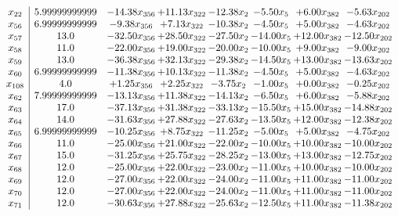 \documentclass[8pt]{article}
\begin{document}
\[\begin{array}{c| c c@{\hskip 2pt} c@{\hskip 2pt} c@{\hskip 2pt} c@{\hskip 2pt} c@{\hskip 2pt} c@{\hskip 2pt} }
 x_{22}   &  5.99999999999 & -14.38 x_{356} & + 11.13 x_{322} & -12.38 x_{2} & -5.50 x_{5} & +  6.00 x_{382} & -5.63 x_{202}\\
 x_{56}   &  6.99999999999 & -9.38 x_{356} & +  7.13 x_{322} & -10.38 x_{2} & -4.50 x_{5} & +  5.00 x_{382} & -4.63 x_{202}\\
 x_{57}   &  13.0 & -32.50 x_{356} & + 28.50 x_{322} & -27.50 x_{2} & -14.00 x_{5} & + 12.00 x_{382} & -12.50 x_{202}\\
 x_{58}   &  11.0 & -22.00 x_{356} & + 19.00 x_{322} & -20.00 x_{2} & -10.00 x_{5} & +  9.00 x_{382} & -9.00 x_{202}\\
 x_{59}   &  13.0 & -36.38 x_{356} & + 32.13 x_{322} & -29.38 x_{2} & -14.50 x_{5} & + 13.00 x_{382} & -13.63 x_{202}\\
 x_{60}   &  6.99999999999 & -11.38 x_{356} & + 10.13 x_{322} & -11.38 x_{2} & -4.50 x_{5} & +  5.00 x_{382} & -4.63 x_{202}\\
 x_{108}   &  4.0 & +  1.25 x_{356} & +  2.25 x_{322} & -3.75 x_{2} & -1.00 x_{5} & +  0.00 x_{382} & -0.25 x_{202}\\
 x_{62}   &  7.99999999999 & -13.13 x_{356} & + 11.38 x_{322} & -14.13 x_{2} & -6.50 x_{5} & +  6.00 x_{382} & -5.88 x_{202}\\
 x_{63}   &  17.0 & -37.13 x_{356} & + 31.38 x_{322} & -33.13 x_{2} & -15.50 x_{5} & + 15.00 x_{382} & -14.88 x_{202}\\
 x_{64}   &  14.0 & -31.63 x_{356} & + 27.88 x_{322} & -27.63 x_{2} & -13.50 x_{5} & + 12.00 x_{382} & -12.38 x_{202}\\
 x_{65}   &  6.99999999999 & -10.25 x_{356} & +  8.75 x_{322} & -11.25 x_{2} & -5.00 x_{5} & +  5.00 x_{382} & -4.75 x_{202}\\
 x_{66}   &  11.0 & -25.00 x_{356} & + 21.00 x_{322} & -22.00 x_{2} & -10.00 x_{5} & + 10.00 x_{382} & -10.00 x_{202}\\
 x_{67}   &  15.0 & -31.25 x_{356} & + 25.75 x_{322} & -28.25 x_{2} & -13.00 x_{5} & + 13.00 x_{382} & -12.75 x_{202}\\
 x_{68}   &  12.0 & -25.00 x_{356} & + 22.00 x_{322} & -23.00 x_{2} & -11.00 x_{5} & + 10.00 x_{382} & -10.00 x_{202}\\
 x_{69}   &  12.0 & -27.00 x_{356} & + 22.00 x_{322} & -24.00 x_{2} & -11.00 x_{5} & + 11.00 x_{382} & -11.00 x_{202}\\
 x_{70}   &  12.0 & -27.00 x_{356} & + 22.00 x_{322} & -24.00 x_{2} & -11.00 x_{5} & + 11.00 x_{382} & -11.00 x_{202}\\
 x_{71}   &  12.0 & -30.63 x_{356} & + 27.88 x_{322} & -25.63 x_{2} & -12.50 x_{5} & + 11.00 x_{382} & -11.38 x_{202}\\

\end{array}\]
\end{document}
